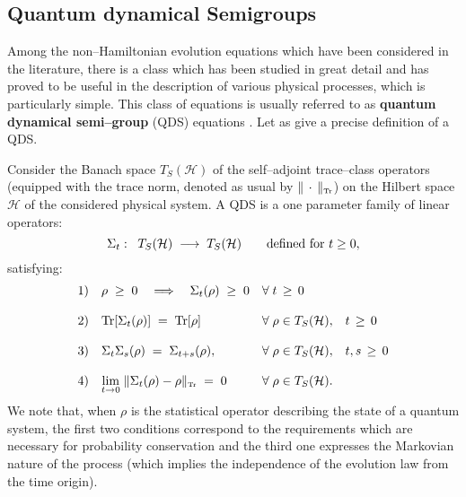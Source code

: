 \documentclass[12pt]{article}
\begin{document}
\subsection{Quantum dynamical Semigroups} \label{sec56}

Among the non--Hamiltonian evolution equations which have been
considered in the literature, there is a class which has been
studied in great detail and has proved to be useful in the
description of various physical processes, which is particularly
simple. This class of equations is usually referred to as {\bf
quantum dynamical semi--group} (QDS) equations \cite{lin}. Let as
give a precise definition of a QDS.

Consider the Banach space $T_{S}({\mathcal H})$ of the
self--adjoint trace--class operators (equipped with the trace
norm, denoted as usual by $\|\,\cdot\,\|_{\makebox{\tiny Tr}}$) on
the Hilbert space ${\mathcal H}$ of the considered physical
system. A QDS is a one parameter family of linear operators:
\[
\Sigma_{t}: \;\; T_{S}({\mathcal H}) \; \longrightarrow \;
T_{S}({\mathcal H}) \qquad \makebox{defined for $t \geq 0$},
\]
satisfying:
\[
\begin{array}{lll}
1) & \rho \; \geq \; 0 \quad \Longrightarrow \quad
\Sigma_{t}(\rho) \; \geq \; 0 & \forall\; t \, \geq \, 0 \\
& & \\
2) & \makebox{Tr} [\Sigma_{t}(\rho)] \; = \; \makebox{Tr} [\rho]
\quad & \forall\; \rho  \in
T_{S}({\mathcal H}), \;\;\; t \, \geq \, 0 \\
& & \\
3) & \Sigma_{t} \Sigma_{s} (\rho) \; = \; \Sigma_{t+s} (\rho), &
\forall\; \rho  \in T_{S}({\mathcal H}), \;\;\;
t, s \, \geq \, 0 \\
& & \\
4) & {\displaystyle \lim_{t\rightarrow 0}}\; \| \Sigma_{t}(\rho) -
\rho \|_{\makebox{\tiny Tr}} \; = \; 0 & \forall\; \rho \in
T_{S}({\mathcal H}).
\end{array}
\]
We note that, when $\rho$ is the statistical operator describing
the state of a quantum system, the first two conditions correspond
to the requirements which are necessary for probability
conservation and the third one expresses the Markovian nature of
the process (which implies the independence of the evolution law
from the time origin).
\end{document}
